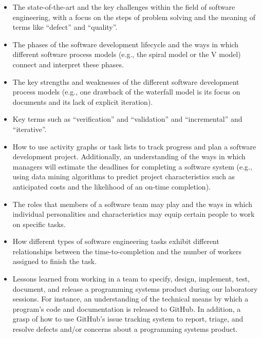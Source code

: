 \documentclass[11pt]{article}
\begin{document}
\vspace*{-.05in}
\begin{itemize}

  \itemsep 0in

  \item The state-of-the-art and the key challenges within the field of software
    engineering, with a focus on the steps of problem solving and the meaning of
    terms like ``defect'' and ``quality''.

  \item The phases of the software development lifecycle and the ways in which
    different software process models (e.g., the spiral model or the V model)
    connect and interpret these phases.

  \item The key strengths and weaknesses of the different software development
    process models (e.g., one drawback of the waterfall model is its focus on
    documents and its lack of explicit iteration).

  \item Key terms such as ``verification'' and ``validation'' and
    ``incremental'' and ``iterative''.

  \item How to use activity graphs or task lists to track progress and plan a
    software development project. Additionally, an understanding of the ways in
    which managers will estimate the deadlines for completing a software system
    (e.g., using data mining algorithms to predict project characteristics such
    as anticipated costs and the likelihood of an on-time completion).

  \item The roles that members of a software team may play and the ways in which
    individual personalities and characteristics may equip certain people to
    work on specific tasks.

  \item How different types of software engineering tasks exhibit different
    relationships between the time-to-completion and the number of workers
    assigned to finish the task.

  \item Lessons learned from working in a team to specify, design, implement,
    test, document, and release a programming systems product during our
    laboratory sessions. For instance, an understanding of the technical means
    by which a program's code and documentation is released to GitHub. In
    addition, a grasp of how to use GitHub's issue tracking system to report,
    triage, and resolve defects and/or concerns about a programming systems
    product.


\end{itemize}
\end{document}
